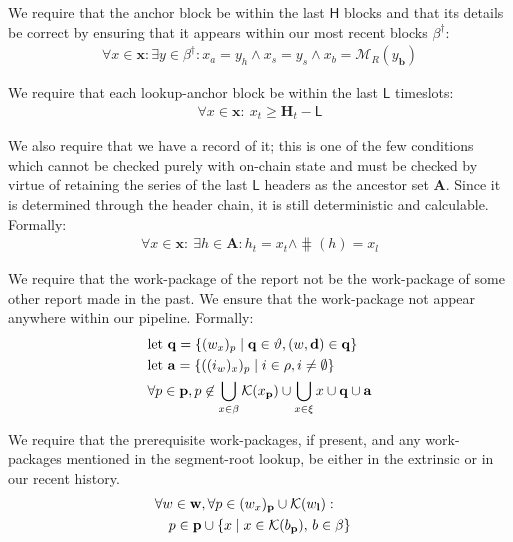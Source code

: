 We require that the anchor block be within the last $\mathsf{H}$ blocks and that its details be correct by ensuring that it appears within our most recent blocks $\beta^\dagger$:
\begin{align}
  \forall x \in \mathbf{x} : \exists y \in \beta^\dagger : x_a = y_h \wedge x_s = y_s \wedge x_b = \mathcal{M}_R(y_\mathbf{b})\!\!\!\!\!\!
\end{align}

We require that each lookup-anchor block be within the last $\mathsf{L}$ timeslots:
\begin{align}
  \forall x \in \mathbf{x} :\ x_t \ge \mathbf{H}_t - \mathsf{L}
\end{align}

We also require that we have a record of it; this is one of the few conditions which cannot be checked purely with on-chain state and must be checked by virtue of retaining the series of the last $\mathsf{L}$ headers as the ancestor set $\mathbf{A}$. Since it is determined through the header chain, it is still deterministic and calculable. Formally:
\begin{align}
  \forall x \in \mathbf{x} :\ \exists h \in \mathbf{A}: h_t = x_t \wedge \hash(h) = x_l
\end{align}

We require that the work-package of the report not be the work-package of some other report made in the past. We ensure that the work-package not appear anywhere within our pipeline. Formally:
\begin{align}
  &\text{let } \mathbf{q} = \{(w_x)_p \mid \mathbf{q} \in \vartheta, (w, \mathbf{d}) \in \mathbf{q}\} \\
  &\text{let } \mathbf{a} = \{((i_w)_x)_p \mid i \in \rho, i \ne \emptyset\}\\
  &\forall p \in \mathbf{p}, p \not\in \bigcup_{x \in \beta}\mathcal{K}(x_\mathbf{p}) \cup \bigcup_{x \in \xi}x \cup \mathbf{q} \cup \mathbf{a}
\end{align}

We require that the prerequisite work-packages, if present, and any work-packages mentioned in the segment-root lookup, be either in the extrinsic or in our recent history.
\begin{align}
  &\begin{aligned}
    &\forall w \in \mathbf{w}, \forall p \in (w_x)_\mathbf{p} \cup \mathcal{K}(w_\mathbf{l}) :\\
    &\quad p \in \mathbf{p} \cup \{ x \mid x \in \mathcal{K}(b_\mathbf{p}) ,\, b \in \beta \}
  \end{aligned}
\end{align}

